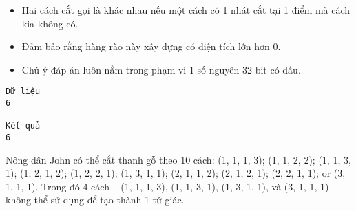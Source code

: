 \begin{itemize}
	\item     Hai cách cắt gọi là khác nhau nếu một cách có 1 nhát cắt tại 1     điểm mà cách kia không có.   
	\item     Đảm bảo rằng hàng rào này xây dựng có diện tích lớn hơn 0.   
	\item     Chú ý đáp án luôn nằm trong phạm vi 1 số nguyên 32 bit có dấu.   
\end{itemize}
\begin{verbatim}
Dữ liệu
6

Kết quả
6
\end{verbatim}
Nông dân John có thể cắt thanh gỗ theo 10 cách: (1, 1, 1, 3); (1, 1, 2, 2); (1, 1, 3, 1); (1, 2, 1, 2); (1, 2, 2, 1); (1, 3, 1, 1); (2, 1, 1, 2); (2, 1, 2, 1); (2, 2, 1, 1); or (3, 1, 1, 1). Trong đó 4 cách -- (1, 1, 1, 3), (1, 1, 3, 1), (1, 3, 1, 1), và (3, 1, 1, 1) -- không thể sử dụng để tạo thành 1 tứ giác.